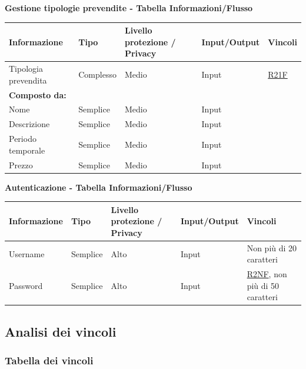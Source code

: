 \documentclass[a4paper]{article}
\begin{document}
\textbf{Gestione tipologie prevendite  - Tabella Informazioni/Flusso}

\begin{center}
    \begin{tabularx}{1\textwidth}{|X|X|X|X|X|}
        \hline
        \textbf{Informazione} &\textbf{Tipo} & \textbf{Livello protezione / Privacy} & \textbf{Input/Output} & \textbf{Vincoli}\\
        \hline
        \hline
        Tipologia prevendita & Complesso & Medio & Input & \hyperlink{R21F}{R21F} \\
        \textbf{Composto da:} & & & & \\
        Nome & Semplice & Medio & Input & \\
        Descrizione & Semplice & Medio & Input & \\
        Periodo temporale & Semplice & Medio & Input & \\
        Prezzo & Semplice & Medio & Input & \\
        \hline
    \end{tabularx}
\end{center}

\textbf{Autenticazione  - Tabella Informazioni/Flusso}

\begin{center}
    \begin{tabularx}{1\textwidth}{|X|X|X|X|X|}
        \hline
        \textbf{Informazione} &\textbf{Tipo} & \textbf{Livello protezione / Privacy} & \textbf{Input/Output} & \textbf{Vincoli}\\
        \hline
        \hline
        Username & Semplice & Alto & Input & Non più di 20 caratteri\\
        \hline
        Password & Semplice & Alto & Input & \hyperlink{R2NF}{R2NF}, non più di 50 caratteri\\
        \hline
    \end{tabularx}
\end{center}

\subsection{Analisi dei vincoli}
\subsubsection{Tabella dei vincoli}


\end{document}
